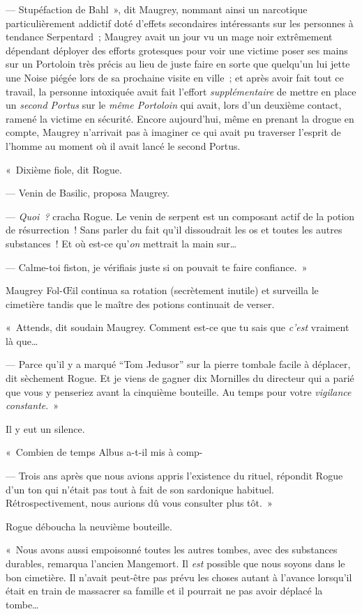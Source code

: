 --- Stupéfaction de Bahl~», dit Maugrey, nommant ainsi un narcotique particulièrement addictif doté d'effets secondaires intéressants sur les personnes à tendance Serpentard~; Maugrey avait un jour vu un mage noir extrêmement dépendant déployer des efforts grotesques pour voir une victime poser ses mains sur un Portoloin très précis au lieu de juste faire en sorte que quelqu'un lui jette une Noise piégée lors de sa prochaine visite en ville~; et après avoir fait tout ce travail, la personne intoxiquée avait fait l'effort \emph{supplémentaire} de mettre en place un \emph{second Portus} sur le \emph{même Portoloin} qui avait, lors d'un deuxième contact, ramené la victime en sécurité. Encore aujourd'hui, même en prenant la drogue en compte, Maugrey n'arrivait pas à imaginer ce qui avait pu traverser l'esprit de l'homme au moment où il avait lancé le second Portus.

«~Dixième fiole, dit Rogue.

--- Venin de Basilic, proposa Maugrey.

--- \emph{Quoi~?} cracha Rogue. Le venin de serpent est un composant actif de la potion de résurrection~! Sans parler du fait qu'il dissoudrait les os et toutes les autres substances~! Et où est-ce qu'\emph{on} mettrait la main sur…

--- Calme-toi fiston, je vérifiais juste si on pouvait te faire confiance.~»

Maugrey Fol-Œil continua sa rotation (secrètement inutile) et surveilla le cimetière tandis que le maître des potions continuait de verser.

«~Attends, dit soudain Maugrey. Comment est-ce que tu sais que \emph{c'est} vraiment là que…

--- Parce qu'il y a marqué “Tom Jedusor” sur la pierre tombale facile à déplacer, dit sèchement Rogue. Et je viens de gagner dix Mornilles du directeur qui a parié que vous y penseriez avant la cinquième bouteille. Au temps pour votre \emph{vigilance constante}.~»

Il y eut un silence.

«~Combien de temps Albus a-t-il mis à comp-

--- Trois ans après que nous avions appris l'existence du rituel, répondit Rogue d'un ton qui n'était pas tout à fait de son sardonique habituel. Rétrospectivement, nous aurions dû vous consulter plus tôt.~»

Rogue déboucha la neuvième bouteille.

«~Nous avons aussi empoisonné toutes les autres tombes, avec des substances durables, remarqua l'ancien Mangemort. Il \emph{est} possible que nous soyons dans le bon cimetière. Il n'avait peut-être pas prévu les choses autant à l'avance lorsqu'il était en train de massacrer sa famille et il pourrait ne pas avoir déplacé la tombe…

